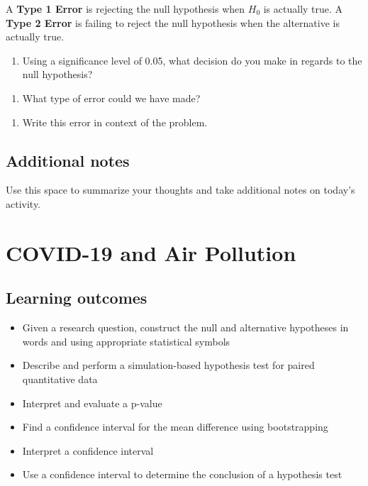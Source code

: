 \documentclass[
]{report}
\providecommand{\tightlist}{%
  \setlength{\itemsep}{0pt}\setlength{\parskip}{0pt}}
\begin{document}
A \textbf{Type 1 Error} is rejecting the null hypothesis when \(H_0\) is actually true. A \textbf{Type 2 Error} is failing to reject the null hypothesis when the alternative is actually true.

\begin{enumerate}
\def\labelenumi{\arabic{enumi}.}
\setcounter{enumi}{25}
\tightlist
\item
  Using a significance level of 0.05, what decision do you make in regards to the null hypothesis?
\end{enumerate}

\vspace{0.5in}

\begin{enumerate}
\def\labelenumi{\arabic{enumi}.}
\setcounter{enumi}{26}
\tightlist
\item
  What type of error could we have made?
\end{enumerate}

\vspace{0.5in}

\begin{enumerate}
\def\labelenumi{\arabic{enumi}.}
\setcounter{enumi}{27}
\tightlist
\item
  Write this error in context of the problem.
\end{enumerate}

\vspace{1in}

\hypertarget{additional-notes}{%
\section{Additional notes}\label{additional-notes}}

Use this space to summarize your thoughts and take additional notes on today's activity.

\hypertarget{covid-19-and-air-pollution}{%
\chapter{COVID-19 and Air Pollution}\label{covid-19-and-air-pollution}}

\hypertarget{learning-outcomes}{%
\section{Learning outcomes}\label{learning-outcomes}}

\begin{itemize}
\item
  Given a research question, construct the null and alternative hypotheses
  in words and using appropriate statistical symbols
\item
  Describe and perform a simulation-based hypothesis test for paired quantitative data
\item
  Interpret and evaluate a p-value
\item
  Find a confidence interval for the mean difference using bootstrapping
\item
  Interpret a confidence interval
\item
  Use a confidence interval to determine the conclusion of a hypothesis test
\end{itemize}
\end{document}
